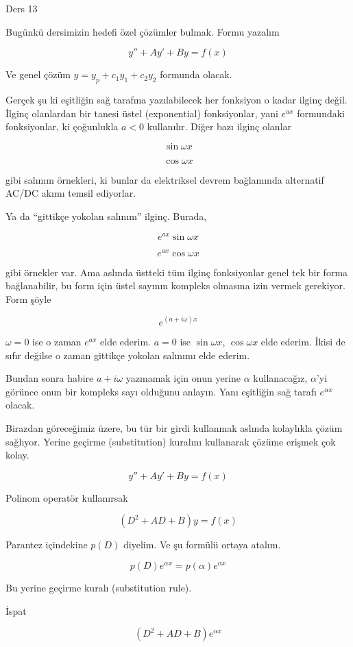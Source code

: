 \documentclass[12pt,fleqn]{article}\usepackage{../../common}
\begin{document}
Ders 13

Bugünkü dersimizin hedefi özel çözümler bulmak. Formu yazalım

$$ y'' + Ay' + By = f(x) $$

Ve genel çözüm $y = y_p + c_1y_1 + c_2y_2$ formunda olacak. 

Gerçek şu ki eşitliğin sağ tarafına yazılabilecek her fonksiyon o kadar
ilginç değil. İlginç olanlardan bir tanesi üstel (exponential)
fonksiyonlar, yani $e^{ax}$ formundaki fonksiyonlar, ki çoğunlukla $a<0$
kullanılır. Diğer bazı ilginç olanlar 

$$ \sin \omega x $$

$$ \cos \omega x $$

gibi salınım örnekleri, ki bunlar da elektriksel devrem bağlamında
alternatif AC/DC akımı temsil ediyorlar.

Ya da ``gittikçe yokolan salınım'' ilginç. Burada,

$$ e^{ax}\sin \omega x $$

$$ e^{ax}\cos \omega x $$

gibi örnekler var. Ama aslında üstteki tüm ilginç fonksiyonlar genel tek
bir forma bağlanabilir, bu form için üstel sayının kompleks olmasına izin
vermek gerekiyor. Form şöyle

$$ e^{(a+i\omega)x} $$

$\omega = 0$ ise o zaman $e^{ax}$ elde ederim. $a=0$ ise $\sin\omega x$,
$\cos\omega x$ elde ederim. İkisi de sıfır değilse o zaman gittikçe yokolan
salınımı elde ederim. 

Bundan sonra habire $a+i\omega$ yazmamak için onun yerine $\alpha$
kullanacağız, $\alpha$'yi görünce onun bir kompleks sayı olduğunu
anlayın. Yanı eşitliğin sağ tarafı $e^{\alpha x}$ olacak. 

Birazdan göreceğimiz üzere, bu tür bir girdi kullanmak aslında kolaylıkla
çözüm sağlıyor. Yerine geçirme (substitution) kuralını kullanarak çözüme
erişmek çok kolay. 

$$ y'' + Ay' + By = f(x) $$

Polinom operatör kullanırsak

$$ (D^2 + AD + B )y = f(x) $$

Parantez içindekine $p(D)$ diyelim. Ve şu formülü ortaya atalım. 

$$ p(D)e^{\alpha x} = p(\alpha)e^{\alpha x}  $$

Bu yerine geçirme kuralı (substitution rule). 

İspat

$$ (D^2 + AD + B )e^{\alpha x} $$
\end{document}
